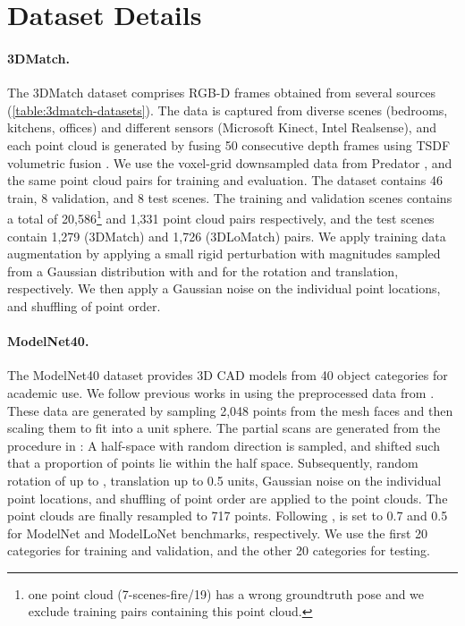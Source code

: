 \documentclass[10pt,twocolumn,letterpaper]{article}
\begin{document}
\section{Dataset Details}\label{sect:dataset-details}
\paragraph{3DMatch.}
The 3DMatch \cite{zeng20163dmatch} dataset comprises RGB-D frames obtained from several sources (\cref{table:3dmatch-datasets}). The data is captured from diverse scenes (\eg bedrooms, kitchens, offices) and different sensors (\eg Microsoft Kinect, Intel Realsense), and each point cloud is generated by fusing 50 consecutive depth frames using TSDF volumetric fusion \cite{curless1996volumetric}. We use the voxel-grid downsampled data from Predator \cite{huang2021predator}, and the same point cloud pairs for training and evaluation. The dataset contains 46 train, 8 validation, and 8 test scenes. The training and validation scenes contains a total of 20,586\footnote{one point cloud (7-scenes-fire\slash19) has a wrong groundtruth pose and we exclude training pairs containing this point cloud.} and 1,331 point cloud pairs respectively, and the test scenes contain 1,279 (3DMatch) and 1,726 (3DLoMatch) pairs. 
We apply training data augmentation by applying a small rigid perturbation with magnitudes sampled from a Gaussian distribution with  and  for the rotation and translation, respectively. We then apply a Gaussian noise  on the individual point locations, and shuffling of point order.

\vspace{-2mm}
\paragraph{ModelNet40.} The ModelNet40 \cite{wu2015modelnet} dataset provides 3D CAD models from 40 object categories for academic use. We follow previous works \cite{yew2020rpmnet,wang2019dcp} in using the preprocessed data from \cite{qi2017pointnet}. These data are generated by sampling 2,048 points from the mesh faces and then scaling them to fit into a unit sphere. The partial scans are generated from the procedure in \cite{yew2020rpmnet}: A half-space with random direction is sampled, and shifted such that a proportion  of points lie within the half space. Subsequently, random rotation of up to , translation up to 0.5 units, Gaussian noise  on the individual point locations, and shuffling of point order are applied to the point clouds. The point clouds are finally resampled to 717 points.
Following \cite{huang2021predator},  is set to 0.7 and 0.5 for ModelNet and ModelLoNet benchmarks, respectively.
We use the first 20 categories for training and validation, and the other 20 categories for testing.
\end{document}

